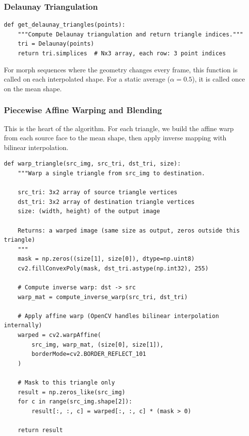 \subsubsection*{Delaunay Triangulation}

\begin{verbatim}
def get_delaunay_triangles(points):
    """Compute Delaunay triangulation and return triangle indices."""
    tri = Delaunay(points)
    return tri.simplices  # Nx3 array, each row: 3 point indices
\end{verbatim}

For morph sequences where the geometry changes every frame, this function is called on each interpolated shape. For a static average ($\alpha=0.5$), it is called once on the mean shape.

\subsubsection*{Piecewise Affine Warping and Blending}

This is the heart of the algorithm. For each triangle, we build the affine warp from each source face to the mean shape, then apply inverse mapping with bilinear interpolation.

\begin{verbatim}
def warp_triangle(src_img, src_tri, dst_tri, size):
    """Warp a single triangle from src_img to destination.

    src_tri: 3x2 array of source triangle vertices
    dst_tri: 3x2 array of destination triangle vertices
    size: (width, height) of the output image

    Returns: a warped image (same size as output, zeros outside this triangle)
    """
    mask = np.zeros((size[1], size[0]), dtype=np.uint8)
    cv2.fillConvexPoly(mask, dst_tri.astype(np.int32), 255)

    # Compute inverse warp: dst -> src
    warp_mat = compute_inverse_warp(src_tri, dst_tri)

    # Apply affine warp (OpenCV handles bilinear interpolation internally)
    warped = cv2.warpAffine(
        src_img, warp_mat, (size[0], size[1]),
        borderMode=cv2.BORDER_REFLECT_101
    )

    # Mask to this triangle only
    result = np.zeros_like(src_img)
    for c in range(src_img.shape[2]):
        result[:, :, c] = warped[:, :, c] * (mask > 0)

    return result
\end{verbatim}

